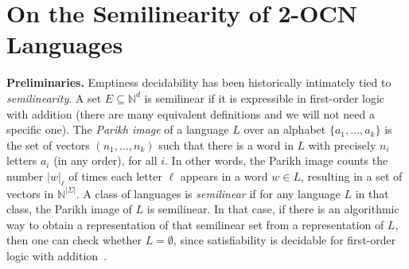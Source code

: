 \documentclass[USenglish]{lipics-v2021}
\newcommand{\mysubparagraph}[1]{\noindent \textbf{\textsf{#1}} }
\begin{document}
\section{On the Semilinearity of 2-OCN Languages}
\label{sec:semilinear}
\mysubparagraph{Preliminaries.}  Emptiness decidability has been historically
intimately tied to \emph{semilinearity}.  A set \(E \subseteq \mathbb{N}^d\) is semilinear if it is
expressible in first-order logic with addition (there are many equivalent
definitions and we will not need a specific one).  The \emph{Parikh image} of a
language \(L\) over an alphabet \(\{a_1, \ldots, a_k\}\) is the set of vectors
\((n_1, \ldots, n_k)\) such that there is a word in \(L\) with precisely \(n_i\) letters
\(a_i\) (in any order), for all \(i\).  In other words, the Parikh image counts the
number \(|w|_\ell\) of times each letter \(\ell\) appears in a word \(w \in L\), resulting in
a set of vectors in \(\mathbb{N}^{|\Sigma|}\).  A class of languages is \emph{semilinear} if for
any language \(L\) in that class, the Parikh image of \(L\) is semilinear.  In that
case, if there is an algorithmic way to obtain a representation of that
semilinear set from a representation of \(L\), then one can check whether
\(L = \emptyset\), since satisfiability is decidable for first-order logic with
addition~\cite{berman1980complexity}.
\end{document}
